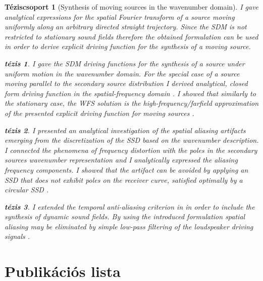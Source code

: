 \documentclass[10pt,twoside]{article}
\theoremstyle{thesisgroupstyle}
\newtheorem{thesisgroup}{Téziscsoport}
\theoremstyle{indented}
\newtheorem{thesis}{tézis}[thesisgroup]
\begin{document}
\begin{thesisgroup}[Synthesis of moving sources in the wavenumber domain]

I gave analytical expressions for the spatial Fourier transform of a source moving uniformly along an arbitrary directed straight trajectory. 
Since the SDM is not restricted to stationary sound fields therefore the obtained formulation can be used in order to derive explicit driving function for the synthesis of a moving source.
\begin{thesis} 
I gave the SDM driving functions for the synthesis of a source under uniform motion in the wavenumber domain.
For the special case of a source moving parallel to the secondary source distribution I derived analytical, closed form driving function in the spatial-frequency domain \cite{Firtha2014:daga_booklet, Firtha2014:isma_booklet, firtha2015sound_booklet}.
I showed that similarly to the stationary case, the WFS solution is the high-frequency/farfield approximation of the presented explicit driving function for moving sources \cite{firtha2015sound_booklet}. 
\end{thesis}
\begin{thesis} 
I presented an analytical investigation of the spatial aliasing artifacts emerging from the discretization of the SSD based on the wavenumber description.
I connected the phenomena of frequency distortion with the poles in the secondary sources wavenumber representation and I analytically expressed the aliasing frequency components.
I showed that the artifact can be avoided by applying an SSD that does not exhibit poles on the receiver curve, satisfied optimally by a circular SSD \cite{firtha2016:daga_booklet}.
\end{thesis}
\begin{thesis} 
I extended the temporal anti-aliasing criterion in in order to include the synthesis of dynamic sound fields.
By using the introduced formulation spatial aliasing may be eliminated by simple low-pass filtering of the loudspeaker driving signals \cite{Firtha2018_daga_moving_source_booklet}.
\end{thesis}
\end{thesisgroup} 
\clearpage

\section*{Publikációs lista}

\nocite{*}
\begin{refcontext}[labelprefix=J]
\printbibliography[title={Folyóiratcikkek}, keyword=J, heading=subbibliography] 
\end{refcontext}
\begin{refcontext}[labelprefix=C]
\printbibliography[title={Konferencia közlemények}, keyword=C, heading=subbibliography] 
\end{refcontext}
\begin{refcontext}[labelprefix=O]
\printbibliography[title={Egyéb publikációk}, keyword=O, heading=subbibliography] 
\end{refcontext}
\end{document}
